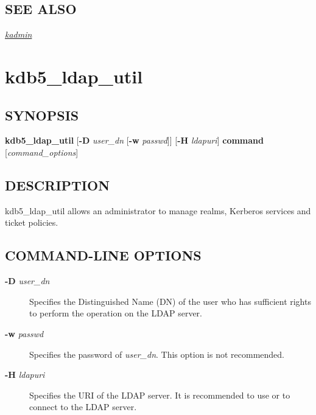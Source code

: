\documentclass[letterpaper,10pt,english]{sphinxmanual}
\begin{document}
\subsection{SEE ALSO}
\label{admin/admin_commands/kdb5_util:see-also}
{\hyperref[admin/admin_commands/kadmin_local:kadmin-1]{\emph{kadmin}}}


\section{kdb5\_ldap\_util}
\label{admin/admin_commands/kdb5_ldap_util:kdb5-ldap-util-8}\label{admin/admin_commands/kdb5_ldap_util::doc}\label{admin/admin_commands/kdb5_ldap_util:kdb5-ldap-util}

\subsection{SYNOPSIS}
\label{admin/admin_commands/kdb5_ldap_util:synopsis}\label{admin/admin_commands/kdb5_ldap_util:kdb5-ldap-util-synopsis}
\textbf{kdb5\_ldap\_util}
{[}\textbf{-D} \emph{user\_dn} {[}\textbf{-w} \emph{passwd}{]}{]}
{[}\textbf{-H} \emph{ldapuri}{]}
\textbf{command}
{[}\emph{command\_options}{]}


\subsection{DESCRIPTION}
\label{admin/admin_commands/kdb5_ldap_util:kdb5-ldap-util-synopsis-end}\label{admin/admin_commands/kdb5_ldap_util:description}
kdb5\_ldap\_util allows an administrator to manage realms, Kerberos
services and ticket policies.


\subsection{COMMAND-LINE OPTIONS}
\label{admin/admin_commands/kdb5_ldap_util:command-line-options}\label{admin/admin_commands/kdb5_ldap_util:kdb5-ldap-util-options}\begin{description}
\item[{\textbf{-D} \emph{user\_dn}}] \leavevmode
Specifies the Distinguished Name (DN) of the user who has
sufficient rights to perform the operation on the LDAP server.

\item[{\textbf{-w} \emph{passwd}}] \leavevmode
Specifies the password of \emph{user\_dn}.  This option is not
recommended.

\item[{\textbf{-H} \emph{ldapuri}}] \leavevmode
Specifies the URI of the LDAP server.  It is recommended to use
 or  to connect to the LDAP server.

\end{description}
\end{document}

